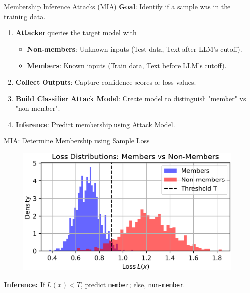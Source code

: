 \documentclass[12pt,aspectratio=169,handout]{beamer}
\begin{document}
\begin{frame}{Membership Inference Attacks (MIA)}
\textbf{Goal:} Identify if a sample was in the training data.
\begin{enumerate}
    \item \textbf{Attacker} queries the target model with
    \begin{itemize}
        \item \textbf{Non-members}: Unknown inputs (Test data, Text after LLM's cutoff).
        \item \textbf{Members}: Known inputs (Train data, Text before LLM's cutoff).
    \end{itemize}
    
    \item \textbf{Collect Outputs}: Capture confidence scores or loss values.
    \item \textbf{Build Classifier Attack Model}: Create model to distinguish "member" vs "non-member".
    \item \textbf{Inference}: Predict membership using Attack Model.
\end{enumerate}

\vspace{1em}


\end{frame}


\begin{frame}{MIA: Determine Membership using Sample Loss}
    \begin{figure}
        \centering
        \includegraphics[width=0.85\linewidth]{img/mia_loss.png}
    \end{figure}

\textbf{Inference:} If $L(x) < T$, predict \texttt{member}; else, \texttt{non-member}.
\end{frame}
\end{document}
